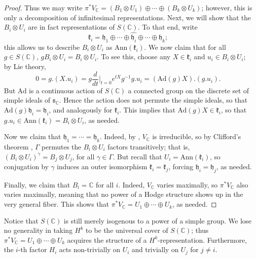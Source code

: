 \documentclass[12pt]{amsart}
\newcommand{\C}{\mathbb{C}}
\newcommand{\wh}{\widehat}
\theoremstyle{definition}
\numberwithin{equation}{section}
\begin{document}
\begin{proof}
Thus we may write \(\pi^* V_\C = (B_1 \otimes U_1) \oplus \cdots \oplus (B_k \otimes U_k)\); 
however, this is only a decomposition of infinitesimal representations. Next, we will show that 
the \(B_i \otimes U_i\) are in fact representations of \(S(\C)\). To that end, write 
\begin{equation*}
    \mathfrak{k}_i = \mathfrak{h}_1 \oplus \cdots \oplus \wh{\mathfrak{h}_i}
    \oplus \cdots \oplus \mathfrak{h}_k;
\end{equation*}
this allows us to describe \(B_i \otimes U_i\) as \(\mathrm{Ann}(\mathfrak{k}_i)\). We 
now claim that for all \(g \in S(\C)\), \(g B_i \otimes U_i = B_i \otimes U_i\). To see this, 
choose any \(X \in \mathfrak{k}_i\) and \(u_i \in B_i \otimes U_i\); by Lie theory, 
\begin{equation*}
    0 = g.(X.u_i) = g \frac{d}{dt}\Big|_{t=0} e^{tX} g^{-1} g . u_i = 
    (\mathrm{Ad}(g) X). (g . u_i).
\end{equation*}
But \(\mathrm{Ad}\) is a continuous action of \(S(\C)\) a connected group
on the discrete set of simple ideals of \(\mathfrak{s}_\C\). Hence the action does not 
permute the simple ideals, so that \(\mathrm{Ad}(g) \mathfrak{h}_i = \mathfrak{h}_i\), 
and analogously for \(\mathfrak{k}_i\). This implies that 
\(\mathrm{Ad}(g) X \in \mathfrak{k}_i\), so that 
\(g.u_i \in \mathrm{Ann}(\mathfrak{k}_i) = B_i \otimes U_i\), as needed.

Now we claim that \(\mathfrak{h}_1 = \cdots = \mathfrak{h}_k\). 
Indeed, by \cite{varvak25}, \(V_\C\) is irreducible, so by Clifford's theorem 
\cite{clifford37}, \(\Gamma\) permutes the \(B_i \otimes U_i\) factors
transitively; that is, \((B_i \otimes U_i)^\gamma = B_j \otimes U_j\), for all
\(\gamma \in \Gamma\). But recall that \(U_i = \mathrm{Ann}(\mathfrak{k}_i)\), so 
conjugation by \(\gamma\) induces an outer isomorphism 
\(\mathfrak{k}_i = \mathfrak{k}_j\), forcing \(\mathfrak{h}_i = \mathfrak{h}_j\), 
as needed.

Finally, we claim that \(B_i = \C\) for all \(i\). Indeed, \(V_\C\) varies maximally, 
so \(\pi^* V_\C\) also varies maximally, meaning that no power of a Hodge structure 
shows up in the very general fiber. This shows that 
\(\pi^* V_\C = U_1 \oplus \cdots \oplus U_k\), as needed.
\end{proof}


Notice that \(S(\C)\) is still merely isogenous to a power of a simple group.
We lose no generality in taking \(H^k\) to be the universal cover of \(S(\C)\);
thus \(\pi^* V_\C = U_1 \oplus \cdots \oplus U_k\) acquires the structure of a 
\(H^k\)-representation. Furthermore, the \(i\)-th factor \(H_i\) acts non-trivially 
on \(U_i\) and trivially on \(U_j\) for \(j \neq i\).
\end{document}
